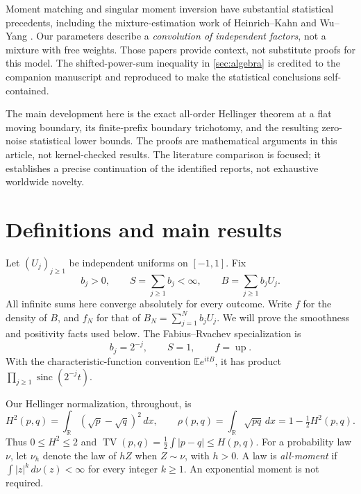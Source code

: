 \documentclass[11pt,a4paper]{article}
\numberwithin{equation}{section}
\theoremstyle{definition}
\theoremstyle{remark}
\DeclareMathOperator{\TV}{TV}
\newcommand{\R}{\mathbb R}
\newcommand{\E}{\mathbb E}
\newcommand{\up}{\operatorname{up}}
\newcommand{\sinc}{\operatorname{sinc}}
\begin{document}
Moment matching and singular moment inversion have substantial statistical
precedents, including the mixture-estimation work of Heinrich--Kahn and
Wu--Yang \cite{heinrich-kahn,wu-yang}. Our parameters describe a
\emph{convolution of independent factors}, not a mixture with free weights.
Those papers provide context, not substitute proofs for this model. The
shifted-power-sum inequality in \cref{sec:algebra} is credited to the companion
manuscript and reproduced to make the statistical conclusions self-contained.

The main development here is the exact all-order Hellinger theorem at a flat
moving boundary, its finite-prefix boundary trichotomy, and the resulting
zero-noise statistical lower bounds. The proofs are mathematical arguments
in this article, not kernel-checked results. The literature comparison is
focused; it establishes a precise continuation of the identified reports,
not exhaustive worldwide novelty.

\section{Definitions and main results}
\label{sec:main}

Let $(U_j)_{j\ge1}$ be independent uniforms on $[-1,1]$. Fix
\begin{equation}
 b_j>0,\qquad S=\sum_{j\ge1}b_j<\infty,\qquad
 B=\sum_{j\ge1}b_jU_j.
 \label{eq:background}
\end{equation}
All infinite sums here converge absolutely for every outcome. Write $f$ for
the density of $B$, and $f_N$ for that of
$B_N=\sum_{j=1}^N b_jU_j$. We will prove the smoothness and positivity facts
used below. The Fabius--Rvachev specialization is
\begin{equation}
 b_j=2^{-j},\qquad S=1,\qquad f=\up.
 \label{eq:up}
\end{equation}
With the characteristic-function convention $\E e^{itB}$, it has product
$\prod_{j\ge1}\sinc(2^{-j}t)$.

Our Hellinger normalization, throughout, is
\begin{equation}
 H^2(p,q)=\int_\R(\sqrt p-\sqrt q)^2\,dx,
 \qquad \rho(p,q)=\int_\R\sqrt{pq}\,dx=1-\tfrac12H^2(p,q).
 \label{eq:hellinger}
\end{equation}
Thus $0\le H^2\le2$ and $\TV(p,q)=\frac12\int|p-q|\le H(p,q)$.
For a probability law $\nu$, let $\nu_h$ denote the law of $hZ$ when
$Z\sim\nu$, with $h>0$. A law is \emph{all-moment} if
$\int |z|^k\,d\nu(z)<\infty$ for every integer $k\ge1$. An exponential
moment is not required.
\end{document}

